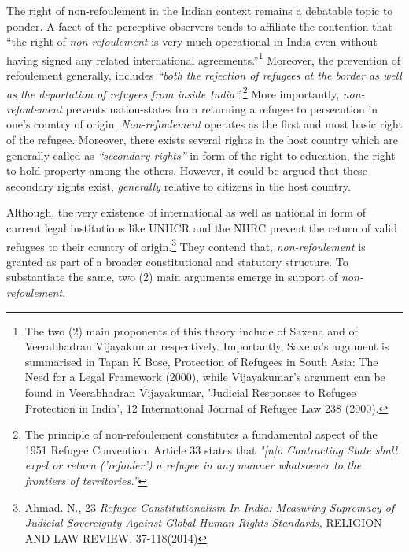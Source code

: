 \begin{multicols}{2}
\vspace{-.1cm}

\noi
The right of non-refoulement in the Indian context remains a debatable topic to ponder. A
facet of the perceptive observers tends to affiliate the contention that “the right of \textit{non-refoulement} is very much operational in India even without having signed any related international agreements.”\footnote{The two (2) main proponents of this theory include of Saxena and of Veerabhadran Vijayakumar respectively. Importantly, Saxena's argument is summarised in Tapan K Bose, Protection of Refugees in South Asia: The Need for a Legal Framework (2000), while Vijayakumar's argument can be found in Veerabhadran Vijayakumar, 'Judicial Responses to Refugee Protection in India', 12 International Journal of Refugee Law 238 (2000).}  Moreover, the prevention of refoulement generally, includes \textit{“both the rejection of refugees at the border as well as the deportation of refugees from inside India”}.\footnote{The principle of non-refoulement constitutes a fundamental aspect of the 1951 Refugee
Convention. Article 33 states that \textit{"[n]o Contracting State shall expel or return ('refouler') a refugee in any manner whatsoever to the frontiers of territories.”}} More importantly, \textit{non-refoulement} prevents nation-states from returning a refugee
to persecution in one’s country of origin. \textit{Non-refoulement} operates as the first and most basic
right of the refugee. Moreover, there exists several rights in the host country which are
generally called as \textit{“secondary rights”} in form of the right to education, the right to hold
property among the others. However, it could be argued that these secondary rights exist,
\textit{generally} relative to citizens in the host country.


\noi
Although, the very existence of international as well as national in form of current legal
institutions like UNHCR and the NHRC prevent the return of valid refugees to their country
of origin.\footnote{Ahmad. N., 23 \textit{Refugee Constitutionalism In India: Measuring Supremacy of Judicial Sovereignty Against Global Human Rights Standards,} RELIGION AND LAW REVIEW, 37-118(2014)} They contend that, \textit{non-refoulement} is granted as part of a broader constitutional
and statutory structure. To substantiate the same, two (2) main arguments emerge in support
of \textit{non-refoulement.}



\end{multicols}
